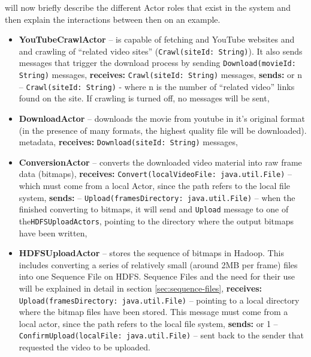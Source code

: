 will now briefly describe the different Actor roles that exist in the system and then explain the interactions between then on an example.

\begin{itemize}
  \item \textbf{YouTubeCrawlActor} -- is capable of fetching and YouTube websites and and crawling of ``related video
                                      sites'' (\verb|Crawl(siteId: String)|). It also sends messages that trigger the 
                                      download process by sending \verb|Download(movieId: String)| messages,
    \subitem  \textbf{receives:}
      \subsubitem \verb|Crawl(siteId: String)| messages,
    \subitem  \textbf{sends:}
       or n -- \verb|Crawl(siteId: String)| - where n is the number of ``related video'' links found on the site.
                                                           If crawling is turned off, no messages will be sent,

  \item \textbf{DownloadActor} -- downloads the movie from youtube in it's original format (in the presence of many formats, 
                                the highest quality file will be downloaded). metadata,
    \subitem  \textbf{receives:}
      \subsubitem \verb|Download(siteId: String)| messages,
                      
                      \newpage          
  \item \textbf{ConversionActor} -- converts the downloaded video material into raw frame data (bitmaps),
    \subitem  \textbf{receives:}
      \subsubitem \verb|Convert(localVideoFile: java.util.File)| -- which must come from a local Actor, since the path refers to the local file system,
    \subitem  \textbf{sends:}
       -- \verb|Upload(framesDirectory: java.util.File)| -- when the finished converting to bitmaps, it will send and \verb|Upload| message to one of the\verb|HDFSUploadActors|, pointing to the directory where the output bitmaps have been written,
                                                                    
  \item \textbf{HDFSUploadActor} -- stores the sequence of bitmaps in Hadoop. This includes converting a series of 
                                  relatively small (around 2MB per frame) files into one Sequence File on HDFS. Sequence Files and the need for their use
                                  will be explained in detail in section \ref{sec:sequence-files},
  \subitem \textbf{receives:}
    \subsubitem \verb|Upload(framesDirectory: java.util.File)| -- pointing to a local directory where the bitmap files have been stored.
                                                                 This message must come from a local actor, since the path refers to the local file system,
    \subitem  \textbf{sends:}
       or 1 -- \verb|ConfirmUpload(localFile: java.util.File)| -- sent back to the sender that requested the video to be uploaded.
\end{itemize}

